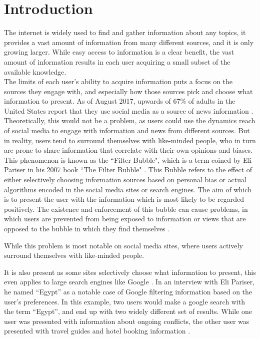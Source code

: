 \chapter{Introduction}
The internet is widely used to find and gather information about any topics, it
provides a vast amount of information from many different sources, and it is
only growing larger.
While easy access to information is a clear benefit, the vast amount of
information results in each user acquiring a small subset of the available
knowledge.\\
The limits of each user's ability to acquire information puts a focus on the
sources they engage with, and especially how those sources pick and choose what
information to present.
As of August 2017, upwards of 67\% of adults in the United States report that
they use social media as a source of news information \citep{journalism2017}.
Theoretically, this would not be a problem, as users could use the dynamics
reach of social media to engage with information and news from different sources.
But in reality, users tend to surround themselves with like-minded people, who
in turn are prone to share information that correlate with their own opinions
and biases.\\

This phenomenon is known as the ``Filter Bubble", which is a term coined by Eli
Pariser in his 2007 book ``The Filter Bubble" \citep{pariser2011filter}.
This Bubble refers to the effect of either selectively choosing information
sources based on personal bias or actual algorithms encoded in the social media
sites or search engines.
The aim of which is to present the user with the information which is most
likely to be regarded positively.
The existence and enforcement of this bubble can cause problems, in which users
are prevented from being exposed to information or views that are opposed to the
bubble in which they find themselves \citep[p.59-73]{pariser2011filter}.\nl

While this problem is most notable on social media sites, where users actively
surround themselves with like-minded people.

It is also present as some sites selectively choose what information to present,
this even applies to large search engines like Google \citep{filterBubbleDef}.
In an interview with Eli Pariser, he named ``Egypt'' as a notable case of
Google filtering information based on the user's preferences.
In this example, two users would make a google search with the term ``Egypt'',
and end up with two widely different set of results.
While one user was presented with information about ongoing conflicts, the other
user was presented with travel guides and hotel booking information
\citep{nusSduSearch}.